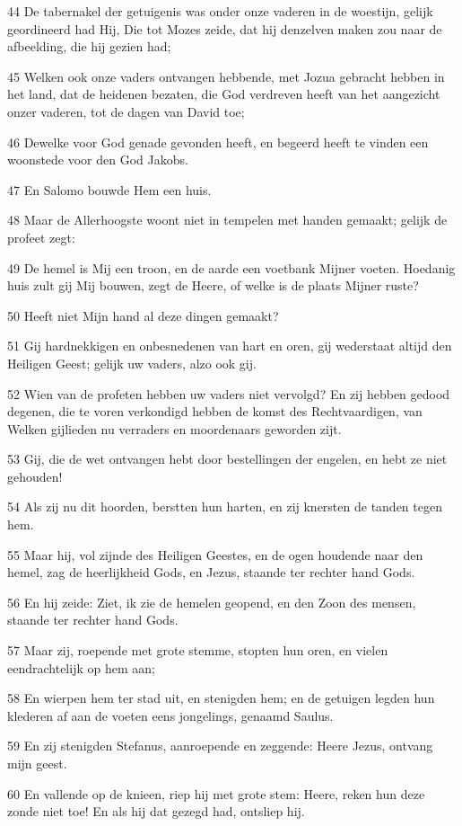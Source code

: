 \par 44 De tabernakel der getuigenis was onder onze vaderen in de woestijn, gelijk geordineerd had Hij, Die tot Mozes zeide, dat hij denzelven maken zou naar de afbeelding, die hij gezien had;
\par 45 Welken ook onze vaders ontvangen hebbende, met Jozua gebracht hebben in het land, dat de heidenen bezaten, die God verdreven heeft van het aangezicht onzer vaderen, tot de dagen van David toe;
\par 46 Dewelke voor God genade gevonden heeft, en begeerd heeft te vinden een woonstede voor den God Jakobs.
\par 47 En Salomo bouwde Hem een huis.
\par 48 Maar de Allerhoogste woont niet in tempelen met handen gemaakt; gelijk de profeet zegt:
\par 49 De hemel is Mij een troon, en de aarde een voetbank Mijner voeten. Hoedanig huis zult gij Mij bouwen, zegt de Heere, of welke is de plaats Mijner ruste?
\par 50 Heeft niet Mijn hand al deze dingen gemaakt?
\par 51 Gij hardnekkigen en onbesnedenen van hart en oren, gij wederstaat altijd den Heiligen Geest; gelijk uw vaders, alzo ook gij.
\par 52 Wien van de profeten hebben uw vaders niet vervolgd? En zij hebben gedood degenen, die te voren verkondigd hebben de komst des Rechtvaardigen, van Welken gijlieden nu verraders en moordenaars geworden zijt.
\par 53 Gij, die de wet ontvangen hebt door bestellingen der engelen, en hebt ze niet gehouden!
\par 54 Als zij nu dit hoorden, berstten hun harten, en zij knersten de tanden tegen hem.
\par 55 Maar hij, vol zijnde des Heiligen Geestes, en de ogen houdende naar den hemel, zag de heerlijkheid Gods, en Jezus, staande ter rechter hand Gods.
\par 56 En hij zeide: Ziet, ik zie de hemelen geopend, en den Zoon des mensen, staande ter rechter hand Gods.
\par 57 Maar zij, roepende met grote stemme, stopten hun oren, en vielen eendrachtelijk op hem aan;
\par 58 En wierpen hem ter stad uit, en stenigden hem; en de getuigen legden hun klederen af aan de voeten eens jongelings, genaamd Saulus.
\par 59 En zij stenigden Stefanus, aanroepende en zeggende: Heere Jezus, ontvang mijn geest.
\par 60 En vallende op de knieen, riep hij met grote stem: Heere, reken hun deze zonde niet toe! En als hij dat gezegd had, ontsliep hij.


